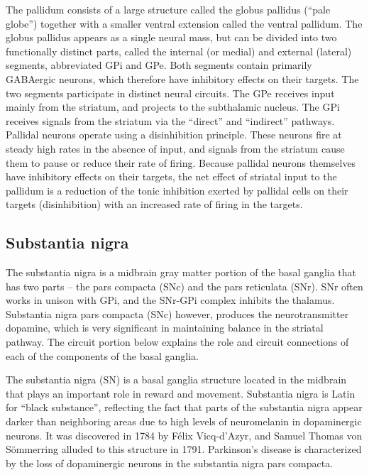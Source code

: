 \documentclass[]{book}
\begin{document}
The pallidum consists of a large structure called the globus pallidus (``pale globe'') together with a smaller ventral extension called the ventral pallidum. The globus pallidus appears as a single neural mass, but can be divided into two functionally distinct parts, called the internal (or medial) and external (lateral) segments, abbreviated GPi and GPe. Both segments contain primarily GABAergic neurons, which therefore have inhibitory effects on their targets. The two segments participate in distinct neural circuits. The GPe receives input mainly from the striatum, and projects to the subthalamic nucleus. The GPi receives signals from the striatum via the ``direct'' and ``indirect'' pathways. Pallidal neurons operate using a disinhibition principle. These neurons fire at steady high rates in the absence of input, and signals from the striatum cause them to pause or reduce their rate of firing. Because pallidal neurons themselves have inhibitory effects on their targets, the net effect of striatal input to the pallidum is a reduction of the tonic inhibition exerted by pallidal cells on their targets (disinhibition) with an increased rate of firing in the targets.

\hypertarget{substantia-nigra}{%
\subsection{Substantia nigra}\label{substantia-nigra}}

The substantia nigra is a midbrain gray matter portion of the basal ganglia that has two parts -- the pars compacta (SNc) and the pars reticulata (SNr). SNr often works in unison with GPi, and the SNr-GPi complex inhibits the thalamus. Substantia nigra pars compacta (SNc) however, produces the neurotransmitter dopamine, which is very significant in maintaining balance in the striatal pathway. The circuit portion below explains the role and circuit connections of each of the components of the basal ganglia.

The substantia nigra (SN) is a basal ganglia structure located in the midbrain that plays an important role in reward and movement. Substantia nigra is Latin for ``black substance'', reflecting the fact that parts of the substantia nigra appear darker than neighboring areas due to high levels of neuromelanin in dopaminergic neurons. It was discovered in 1784 by Félix Vicq-d'Azyr, and Samuel Thomas von Sömmerring alluded to this structure in 1791. Parkinson's disease is characterized by the loss of dopaminergic neurons in the substantia nigra pars compacta.
\end{document}
